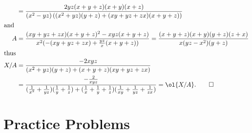 \documentclass[11pt]{scrartcl}
\begin{document}
\begin{soln}
\begin{align*}
    &= \frac{2yz(x+y+z)(x+y)(x+z)}{(x^2-yz)\left( (x^2+yz)(y+z)+(xy+yz+zx)(x+y+z) \right)} \\
    \intertext{and}
    A &= \frac{(xy+yz+zx)(x+y+z)^2-xyz(x+y+z)}{x^2(-(xy+yz+zx)+\frac{yz}{x}(x+y+z))}
    = \frac{(x+y+z)(x+y)(y+z)(z+x)}{x(yz-x^2)(y+z)} \\
    \intertext{thus}
    X/A &= \frac{-2xyz}{(x^2+yz)(y+z)+(x+y+z)(xy+yz+zx)} \\
    &= \frac{-\frac{2}{xyz}}%
    {(\frac{1}{x^2}+\frac1{yz})(\frac1y+\frac1z)  +  (\frac1x+\frac1y+\frac1z)(\frac1{xy}+\frac1{yz}+\frac1{zx})} = \ol{X/A}. \qedhere
  \end{align*}
\end{soln}


\section{Practice Problems}
\end{document}
